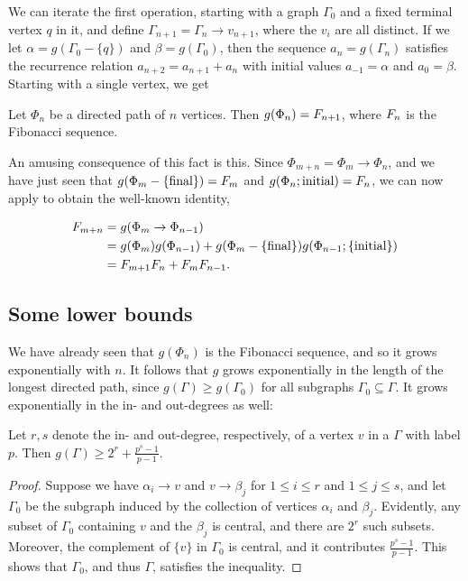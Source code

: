 We can iterate the first operation, starting with a graph $\Gamma_0$ and a fixed terminal vertex $q$ in it,
and define $\Gamma_{n + 1} = \Gamma_{n} \rightarrow v_{n + 1}$, where the $v_i$ are all distinct.
If we let $\alpha = g(\Gamma_0 - \{q\})$ and $\beta = g(\Gamma_0)$,
then the sequence $a_n = g(\Gamma_n)$ satisfies the recurrence relation $a_{n + 2} = a_{n + 1} + a_{n}$
with initial values $a_{-1} = \alpha$ and $a_0 = \beta$.
Starting with a single vertex, we get

\begin{prop}
	Let $\Phi_n$ be a directed path of $n$ vertices.
Then $g(\Phi_n) = F_{n + 1}$, where $F_{n}$ is the Fibonacci sequence.
\end{prop}

An amusing consequence of this fact is this.
Since $\Phi_{m + n} = \Phi_m \rightarrow \Phi_n$, and we have just seen that $g(\Phi_m - \{\text{final}\}) = F_{m}$ and $g(\Phi_n; \text{initial}) = F_{n}$, 
we can now apply \hyperref[eustick]{} to obtain the well-known identity, \begin{enumrealm}
\begin{align*}
	F_{m + n} &= g(\Phi_m \rightarrow \Phi_{n - 1}) \\
	&= g(\Phi_m)g(\Phi_{n - 1}) + g(\Phi_m - \{\text{final}\})g(\Phi_{n - 1}; \{\text{initial}\}) \\
	&= F_{m + 1}F_{n} + F_{m}F_{n - 1}.
\end{align*}\end{enumrealm}
\vspace{-\baselineskip}
\subsection{Some lower bounds}
We have already seen that $g(\Phi_n)$ is the Fibonacci sequence, and so it grows exponentially with $n$.
It follows that $g$ grows exponentially in the length of the longest directed path, since $g(\Gamma) \ge  g(\Gamma_0)$ for all subgraphs $\Gamma_0 \subseteq \Gamma$.
It grows exponentially in the in- and out-degrees as well:
\begin{lem}
	Let $r, s$ denote the in- and out-degree, respectively, of a vertex $v$ in a  $\Gamma$ with label $p$.
Then $g(\Gamma) \ge 2^r + \frac{p^s - 1}{p - 1}$.
\end{lem}
\begin{proof}
	Suppose we have $\alpha_i \rightarrow v$ and $v \rightarrow \beta_j$ for $1 \le i \le r$ and $1 \le j \le s$,
	and let $\Gamma_0$ be the subgraph induced by the collection of vertices $\alpha_i$ and $\beta_j$.
	Evidently, any subset of $\Gamma_0$ containing $v$ and the $\beta_j$ is central, and there are $2^r$ such subsets.
	Moreover, the complement of $\{v\}$ in $\Gamma_0$ is central, and it contributes $\frac{p^s - 1}{p - 1}$.
	This shows that $\Gamma_0$, and thus $\Gamma$, satisfies the inequality.
\end{proof}

